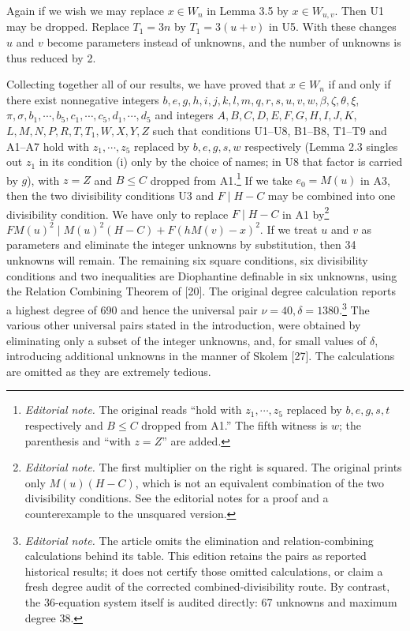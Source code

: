 \documentclass[11pt,a4paper]{article}
\newcommand{\origpage}[1]{\marginnote{\footnotesize\textbf{[#1]}}}
\newcommand{\ednote}[1]{\footnote{\textit{Editorial note.} #1}}
\begin{document}
\origpage{349}Again if we wish we may replace $x \in W_{n}$ in Lemma 3.5 by $x \in W_{u, v}$. Then U1 may be dropped. Replace $T_{1}=3 n$ by $T_{1}=3(u+v)$ in U5. With these changes $u$ and $v$ become parameters instead of unknowns, and the number of unknowns is thus reduced by 2.

Collecting together all of our results, we have proved that $x \in W_{n}$ if and only if there exist nonnegative integers $b, e, g, h, i, j, k, l, m, q, r, s, u, v, w, \beta, \zeta, \theta, \xi$, $\pi, \sigma, b_{1}, \cdots, b_{5}, c_{1}, \cdots, c_{5}, d_{1}, \cdots, d_{5}$ and integers $A, B, C, D, E, F, G, H, I, J, K$, $L, M, N, P, R, T, T_{1}, W, X, Y, Z$ such that conditions U1--U8, B1--B8, T1--T9 and A1--A7 hold with $z_{1}, \cdots, z_{5}$ replaced by $b,e,g,s,w$ respectively (Lemma 2.3 singles out $z_1$ in its condition (i) only by the choice of names; in U8 that factor is carried by $g$), with $z=Z$ and $B \leq C$ dropped from A1.\ednote{The original reads ``hold with $z_1,\cdots,z_5$ replaced by $b,e,g,s,t$ respectively and $B\leq C$ dropped from A1.'' The fifth witness is $w$; the parenthesis and ``with $z=Z$'' are added.} If we take $e_0=M(u)$ in A3, then the two divisibility conditions U3 and $F \mid H-C$ may be combined into one divisibility condition. We have only to replace $F \mid H-C$ in A1 by\ednote{The first multiplier on the right is squared. The original prints only $M(u)(H-C)$, which is not an equivalent combination of the two divisibility conditions. See the editorial notes for a proof and a counterexample to the unsquared version.} $FM(u)^2\mid M(u)^2(H-C)+F(hM(v)-x)^2$. If we treat $u$ and $v$ as parameters and eliminate the integer unknowns by substitution, then 34 unknowns will remain. The remaining six square conditions, six divisibility conditions and two inequalities are Diophantine definable in six unknowns, using the Relation Combining Theorem of [20]. The original degree calculation reports a highest degree of 690 and hence the universal pair $\nu=40,\delta=1380$.\ednote{The article omits the elimination and relation-combining calculations behind its table. This edition retains the pairs as reported historical results; it does not certify those omitted calculations, or claim a fresh degree audit of the corrected combined-divisibility route. By contrast, the 36-equation system itself is audited directly: 67 unknowns and maximum degree 38.} The various other universal pairs stated in the introduction, were obtained by eliminating only a subset of the integer unknowns, and, for small values of $\delta$, introducing additional unknowns in the manner of Skolem [27]. The calculations are omitted as they are extremely tedious.
\end{document}
